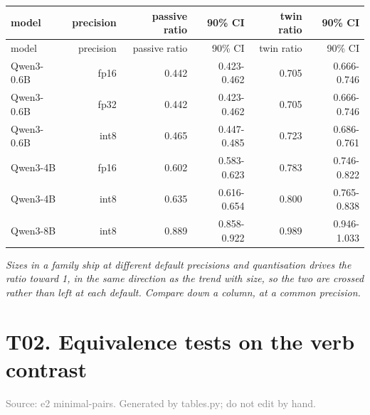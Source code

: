 \documentclass[10pt]{article}
\begin{document}
\footnotesize
\begin{longtable}{lrrrrr}
\toprule
model & precision & passive ratio & 90\% CI & twin ratio & 90\% CI \\
\midrule
\endfirsthead
\toprule
model & precision & passive ratio & 90\% CI & twin ratio & 90\% CI \\
\midrule
\endhead
\bottomrule
\endfoot
Qwen3-0.6B & fp16 & 0.442 & 0.423-0.462 & 0.705 & 0.666-0.746 \\
Qwen3-0.6B & fp32 & 0.442 & 0.423-0.462 & 0.705 & 0.666-0.746 \\
Qwen3-0.6B & int8 & 0.465 & 0.447-0.485 & 0.723 & 0.686-0.761 \\
Qwen3-4B & fp16 & 0.602 & 0.583-0.623 & 0.783 & 0.746-0.822 \\
Qwen3-4B & int8 & 0.635 & 0.616-0.654 & 0.800 & 0.765-0.838 \\
Qwen3-8B & int8 & 0.889 & 0.858-0.922 & 0.989 & 0.946-1.033 \\
\end{longtable}
\normalsize

\textit{Sizes in a family ship at different default precisions and quantisation drives the ratio toward 1, in the same direction as the trend with size, so the two are crossed rather than left at each default. Compare down a column, at a common precision.}
\clearpage

\section*{T02. Equivalence tests on the verb contrast}
\textcolor{gray}{Source: e2 minimal-pairs. Generated by tables.py; do not edit by hand.}
\end{document}
